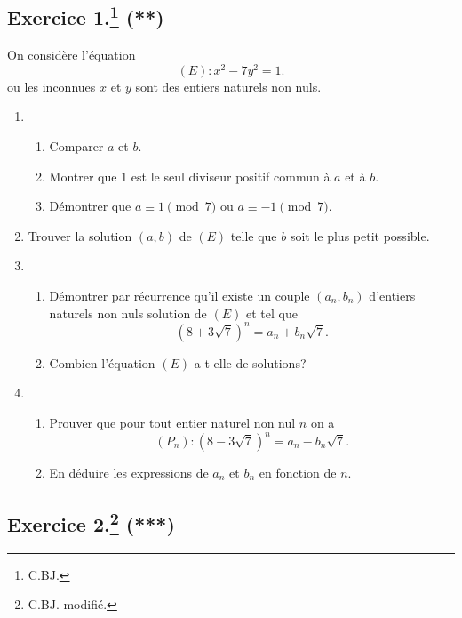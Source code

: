 \documentclass[a4paper]{article}
\begin{document}
\subsection*{Exercice 1.\footnote{C.BJ.} (**)}
On considère l'équation \[
	(E):x^2-7y^2=1
.\] ou les inconnues $x$ et $y$ sont des entiers naturels non nuls.
\begin{enumerate}
	\item \begin{enumerate}[label=(\alph*)]
		\item Comparer $a$ et $b$.
		\item Montrer que $1$ est le seul diviseur positif commun à $a$ et à $b$.
		\item Démontrer que $a\equiv 1\pmod{7}$ ou $a\equiv -1 \pmod{7}$.
	\end{enumerate}
\item Trouver la solution $(a,b)$ de $(E)$ telle que $b$ soit le plus petit possible.
\item 	\begin{enumerate}[label=(\alph*)]
	\item Démontrer par récurrence qu'il existe un couple $(a_n,b_n)$ d'entiers naturels non nuls solution de $(E)$ et tel que \[
			(8+3\sqrt{7})^n=a_n+b_n\sqrt{7}	.\]
		\item Combien l'équation $(E)$ a-t-elle de solutions?
	\end{enumerate}	
\item 	\begin{enumerate}[label=(\alph*)]
	\item Prouver que pour tout entier naturel non nul $n$ on a \[
			(P_n):(8-3\sqrt{7})^n=a_n-b_n\sqrt{7}.\] 		
	\item En déduire les expressions de $a_n$ et $b_n$ en fonction de $n$.
	\end{enumerate}
\end{enumerate}



\subsection*{Exercice 2.\footnote{C.BJ. modifié.} (***)}
\end{document}

